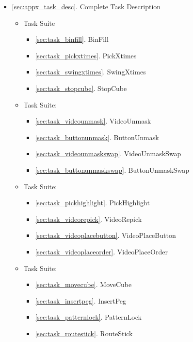 \begin{itemize}
\item \ref{sec:appx_task_desc}. Complete Task Description
  \begin{itemize}
      \item Task Suite \TSone
        \begin{itemize}
          \item \ref{sec:task_binfill}. BinFill
          \item \ref{sec:task_pickxtimes}. PickXtimes
          \item \ref{sec:task_swingxtimes}. SwingXtimes
          \item \ref{sec:task_stopcube}. StopCube
      \end{itemize}
      \item Task Suite: \TStwo
        \begin{itemize}
              \item \ref{sec:task_videounmask}. VideoUnmask
              \item \ref{sec:task_buttonunmask}. ButtonUnmask
              \item \ref{sec:task_videounmaskswap}. VideoUnmaskSwap
              \item \ref{sec:task_buttonunmaskswap}. ButtonUnmaskSwap
        \end{itemize}
    \item Task Suite: \TSthree
        \begin{itemize}
         \item \ref{sec:task_pickhighlight}. PickHighlight
          \item \ref{sec:task_videorepick}. VideoRepick
          \item \ref{sec:task_videoplacebutton}. VideoPlaceButton
         \item \ref{sec:task_videoplaceorder}. VideoPlaceOrder
    \end{itemize}
    \item Task Suite: \TSfour
        \begin{itemize}
             \item \ref{sec:task_movecube}. MoveCube
              \item \ref{sec:task_insertpeg}. InsertPeg
              \item \ref{sec:task_patternlock}. PatternLock
              \item \ref{sec:task_routestick}. RouteStick
        \end{itemize}

    \end{itemize}
\end{itemize}




